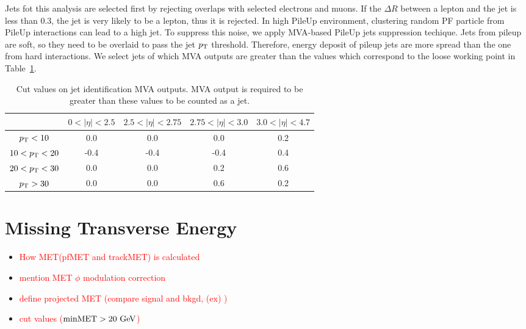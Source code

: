 Jets fot this analysis are selected first by rejecting overlaps with selected electrons 
and muons. If the $\Delta R$ between a lepton and the jet is less than 0.3, the jet 
is very likely to be a lepton, thus it is rejected. In high PileUp environment, 
clustering random PF particle from PileUp interactions can lead to a high \pt{} jet. 
To suppress this noise, we apply MVA-based PileUp jets suppression techique. 
Jets from pileup are soft, so they need to be overlaid to pass the jet $p_\mathrm{T}$ threshold. 
Therefore, energy deposit of pileup jets are more spread than the one from hard interactions.
We select jets of which MVA outputs are greater than the values 
which correspond to the loose working point in Table~\ref{tab:jetidcut}.
\begin{table}[htp]
	\centering
		\begin{tabular}{c|c|c|c|c}
			\hline
									&  $0<|\eta|<2.5$ 	& $2.5<|\eta|<2.75$		& $2.75<|\eta|<3.0$ 	& $3.0<|\eta|<4.7$ 		\\ 
			\hline \hline
				$p_\mathrm{T}<10$ \GeV		& 0.0 				& 0.0					& 0.0	 				& 0.2					\\ 
				$10<p_\mathrm{T}<20$	\GeV 	& -0.4 				& -0.4					& -0.4	 				& 0.4					\\
				$20<p_\mathrm{T}<30$	\GeV	& 0.0 				& 0.0					& 0.2	 				& 0.6					\\ 
				$p_\mathrm{T}>30$ \GeV 		& 0.0 				& 0.0					& 0.6	 				& 0.2					\\
			\hline 
		\end{tabular}
		\caption{Cut values on jet identification MVA outputs. MVA output is required to be greater than 
				these values to be counted as a jet.}
	\label{tab:jetidcut}
\end{table}



\section{ Missing Transverse Energy }
\begin{itemize}
\item \textcolor{red}{How MET(pfMET and trackMET) is calculated } 
\item \textcolor{red}{mention MET $\phi$ modulation correction }
\item \textcolor{red}{define projected MET (compare signal and bkgd, (ex) \ztt)}
\item \textcolor{red}{cut values ($\textrm{minMET} > 20~\mathrm{Ge\kern -0.1em V}$) }
\end{itemize}



